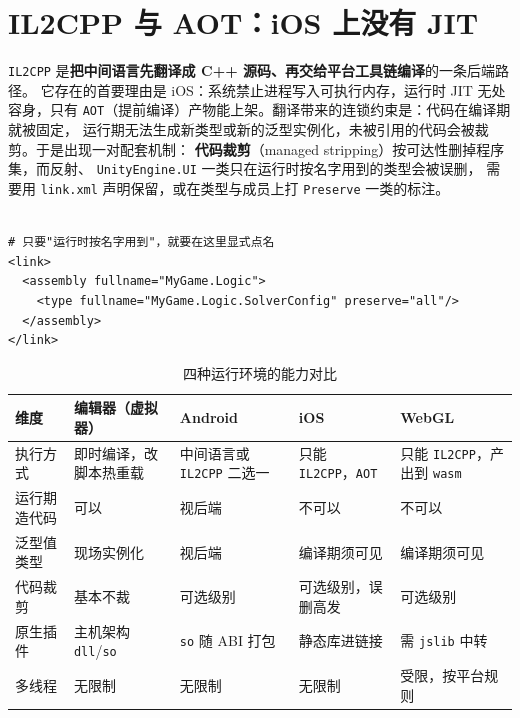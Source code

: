 \documentclass[12pt,a4paper,fontset=fandol]{ctexbook}
\newcommand{\Tp}[1]{\texttt{#1}}
\newcommand{\Bk}{\discretionary{}{}{}}
\newcommand{\Lang}[1]{\textsf{#1}}
\newcommand{\CPP}{\Lang{C++}}
\begin{document}
\section{IL2CPP 与 AOT：iOS 上没有 JIT}
\label{sec:ch11-il2cpp}

\Tp{IL2CPP} 是\textbf{把中间语言先翻译成 \CPP{} 源码、再交给平台工具链编译}的一条后端路径。
它存在的首要理由是 iOS：系统禁止进程写入可执行内存，运行时 JIT 无处容身，只有
\Tp{AOT}（提前编译）产物能上架。翻译带来的连锁约束是：代码在编译期就被固定，
运行期无法生成新类型或新的泛型实例化，未被引用的代码会被裁剪。于是出现一对配套机制：
\textbf{代码裁剪}（managed stripping）按可达性删掉程序集，而反射、
\Tp{UnityEngine.UI} 一类只在运行时按名字用到的类型会被误删，
需要用 \Tp{link.xml} 声明保留，或在类型与成员上打 \Tp{Preserve} 一类的标注。

\begin{lstlisting}[style=yamlstyle, caption={link.xml 的保留声明形状（标签名与层级以官方文档为准）}, label={lst:ch11-linkxml}, framexleftmargin=12pt, framexrightmargin=12pt]

# 只要"运行时按名字用到"，就要在这里显式点名
<link>
  <assembly fullname="MyGame.Logic">
    <type fullname="MyGame.Logic.SolverConfig" preserve="all"/>
  </assembly>
</link>
\end{lstlisting}

\begin{table}[htbp]
\centering
\caption{四种运行环境的能力对比}
\label{tab:ch11-runtime}
\begin{tabular}{>{\raggedright\arraybackslash}p{} >{\raggedright\arraybackslash}p{} >{\raggedright\arraybackslash}p{} >{\raggedright\arraybackslash}p{} >{\raggedright\arraybackslash}p{}}
\toprule
\textbf{维度} & \textbf{编辑器（虚拟器）} & \textbf{Android} & \textbf{iOS} & \textbf{WebGL} \\
\midrule
执行方式 & 即时编译，改脚本热重载 & 中间语言或 \Tp{IL2CPP} 二选一 & 只能 \Tp{IL2CPP}，\Tp{AOT} & 只能 \Tp{IL2CPP}，产出到 \Tp{wasm} \\
运行期造代码 & 可以 & 视后端 & 不可以 & 不可以 \\
泛型值类型 & 现场实例化 & 视后端 & 编译期须可见 & 编译期须可见 \\
代码裁剪 & 基本不裁 & 可选级别 & 可选级别，误删高发 & 可选级别 \\
原生插件 & 主机架构 \Tp{dll}/{\Bk}\Tp{so} & \Tp{so} 随 ABI 打包 & 静态库进链接 & 需 \Tp{jslib} 中转 \\
多线程 & 无限制 & 无限制 & 无限制 & 受限，按平台规则 \\
\bottomrule
\end{tabular}
\end{table}
\end{document}

